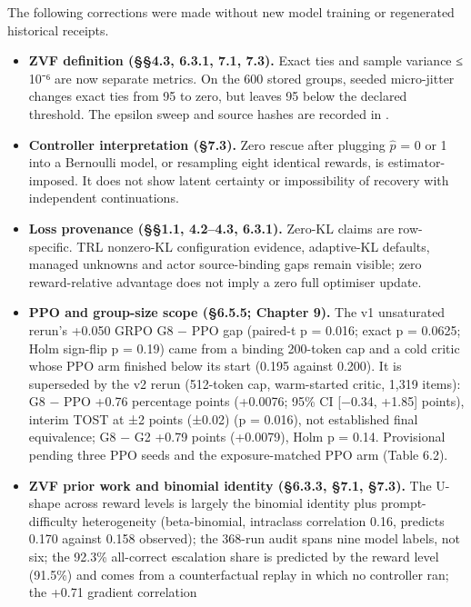 \documentclass[12pt,a4paper]{report}
\DeclareRobustCommand{\longtok}[1]{\texttt{\seqsplit{#1}}}
\providecommand{\tightlist}{%
  \setlength{\itemsep}{0pt}\setlength{\parskip}{0pt}}
\begin{document}
The following corrections were made without new model training or
regenerated historical receipts.

\begin{itemize}
\tightlist
\item
  \textbf{ZVF definition (§§4.3, 6.3.1, 7.1, 7.3).} Exact ties and
  sample variance ≤ 10⁻⁶ are now separate metrics. On the 600 stored
  groups, seeded micro-jitter changes exact ties from 95 to zero, but
  leaves 95 below the declared threshold. The epsilon sweep and source
  hashes are recorded in
  \longtok{pcd\_\allowbreak{}vs\_\allowbreak{}zvf\_\allowbreak{}tolerance\_\allowbreak{}analysis.json}.
\item
  \textbf{Controller interpretation (§7.3).} Zero rescue after plugging
  \ensuremath{\hat{p}} = 0 or 1 into a Bernoulli model, or resampling eight identical
  rewards, is estimator-imposed. It does not show latent certainty or
  impossibility of recovery with independent continuations.
\item
  \textbf{Loss provenance (§§1.1, 4.2--4.3, 6.3.1).} Zero-KL claims are
  row-specific. TRL nonzero-KL configuration evidence, adaptive-KL
  defaults, managed unknowns and actor source-binding gaps remain
  visible; zero reward-relative advantage does not imply a zero full
  optimiser update.
\item
  \textbf{PPO and group-size scope (§6.5.5; Chapter 9).} The v1
  unsaturated rerun's +0.050 GRPO G8 − PPO gap (paired-t p = 0.016;
  exact p = 0.0625; Holm sign-flip p = 0.19) came from a binding
  200-token cap and a cold critic whose PPO arm finished below its start
  (0.195 against 0.200). It is superseded by the v2 rerun (512-token
  cap, warm-started critic, 1,319 items): G8 − PPO +0.76 percentage
  points (+0.0076; 95\% CI {[}−0.34, +1.85{]} points), interim TOST at
  ±2 points (±0.02) (p = 0.016), not established final equivalence; G8 −
  G2 +0.79 points (+0.0079), Holm p = 0.14. Provisional pending three
  PPO seeds and the exposure-matched PPO arm (Table 6.2).
\item
  \textbf{ZVF prior work and binomial identity (§6.3.3, §7.1, §7.3).}
  The U-shape across reward levels is largely the binomial identity plus
  prompt-difficulty heterogeneity (beta-binomial, intraclass correlation
  0.16, predicts 0.170 against 0.158 observed); the 368-run audit spans
  nine model labels, not six; the 92.3\% all-correct escalation share is
  predicted by the reward level (91.5\%) and comes from a counterfactual
  replay in which no controller ran; the +0.71 gradient correlation

\end{itemize}
\end{document}
